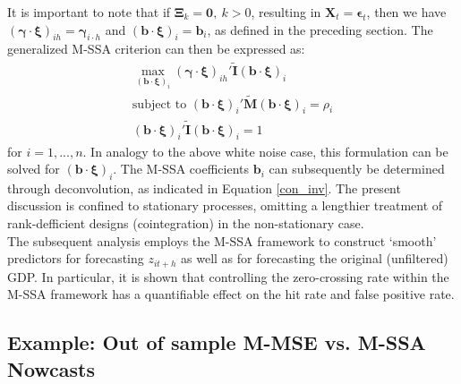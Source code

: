 \documentclass[11pt,a4paper]{article}
\begin{document}
It is important to note that if $\boldsymbol{\Xi}_k=\mathbf{0},~k>0$, resulting in $\mathbf{X}_t=\boldsymbol{\epsilon}_t$, then we have $(\boldsymbol{\gamma}\cdot\boldsymbol{\xi})_{ih}=\boldsymbol{\gamma}_{i\cdot h}$ and $(\mathbf{b}\cdot\boldsymbol{\xi})_{i}=\mathbf{b}_i$, as defined in the preceding section. The generalized M-SSA criterion can then be expressed as: 
\begin{eqnarray}\label{gen_stat_x}
\max_{(\mathbf{b}\cdot\boldsymbol{\xi})_i} (\boldsymbol{\gamma}\cdot\boldsymbol{\xi})_{ih}'\mathbf{\tilde{I}} (\mathbf{b}\cdot\boldsymbol{\xi})_i\\
\textrm{subject~to~}(\mathbf{b}\cdot\boldsymbol{\xi})_i'\mathbf{\tilde{M}}(\mathbf{b}\cdot\boldsymbol{\xi})_i=\rho_i\nonumber\\
(\mathbf{b}\cdot\boldsymbol{\xi})_i'\mathbf{\tilde{I}}(\mathbf{b}\cdot\boldsymbol{\xi})_i=1\nonumber
\end{eqnarray}
for $i=1,...,n$. In analogy to the above white noise case, this formulation can be solved for $(\mathbf{b}\cdot\boldsymbol{\xi})_i$. The M-SSA coefficients $\mathbf{b}_i$ can subsequently be determined through deconvolution, as indicated in Equation \eqref{con_inv}. 
The present discussion is confined to stationary processes, omitting a lengthier treatment of rank-defficient designs (cointegration) in the non-stationary case.\\


The subsequent analysis employs the M-SSA framework to construct `smooth' predictors for forecasting $z_{it+h}$ as well as for forecasting the original (unfiltered) GDP. In particular, it is shown that controlling the zero-crossing rate within the M-SSA framework has a quantifiable effect on the hit rate and false positive rate.

 
 

\subsection{Example: Out of sample M-MSE vs. M-SSA Nowcasts}
\end{document}
